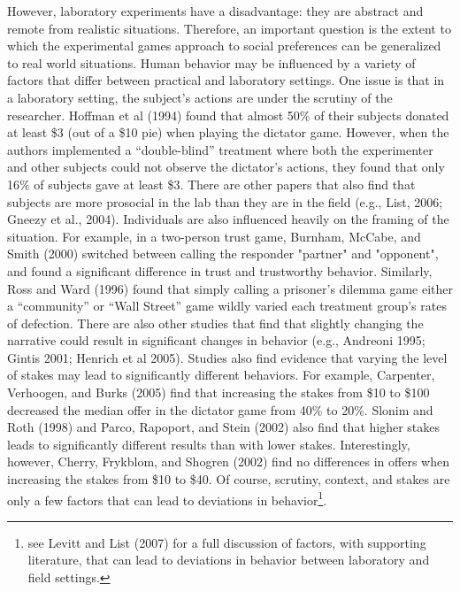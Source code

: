 \documentclass[12pt]{article}
\begin{document}
However, laboratory experiments have a disadvantage: they are abstract and remote from realistic situations. Therefore, an important question is the extent to which the experimental games approach to social preferences can be generalized to real world situations. Human behavior may be influenced by a variety of factors that differ between practical and laboratory settings. One issue is that in a laboratory setting, the subject's actions are under the scrutiny of the researcher. Hoffman et al (1994) found that almost 50\% of their subjects donated at least \$3 (out of a \$10 pie) when playing the dictator game. However, when the authors implemented a ``double-blind'' treatment where both the experimenter and other subjects could not observe the dictator\rq s actions, they found that only 16\% of subjects gave at least \$3. There are other papers that also find that subjects are more prosocial in the lab than they are in the field (e.g., List, 2006; Gneezy et al., 2004). Individuals are also influenced heavily on the framing of the situation. For example, in a two-person trust game, Burnham, McCabe, and Smith (2000) switched between calling the responder "partner" and "opponent", and found a significant difference in trust and trustworthy behavior. Similarly, Ross and Ward (1996) found that simply calling a prisoner's dilemma game either a ``community'' or ``Wall Street'' game wildly varied each treatment group\rq s rates of defection. {\color{red}There are also other studies that find that slightly changing the narrative could result in significant changes in behavior (e.g., Andreoni 1995; Gintis 2001;  Henrich et al 2005)}. Studies also find evidence that varying the level of stakes may lead to significantly different behaviors. For example, Carpenter, Verhoogen, and Burks (2005) find that increasing the stakes from \$10 to \$100 decreased the median offer in the dictator game from 40\% to 20\%. Slonim and Roth (1998) and Parco, Rapoport, and Stein (2002) also find that higher stakes leads to significantly different results than with lower stakes. Interestingly, however, Cherry, Frykblom, and Shogren (2002) find no differences in offers when increasing the stakes from \$10 to \$40. Of course, scrutiny, context, and stakes are only a few factors that can lead to deviations in behavior\footnote{see Levitt and List (2007) for a full discussion of factors, with supporting literature, that can lead to deviations in behavior between laboratory and field settings.}.
 
\end{document}
